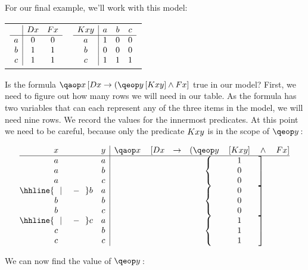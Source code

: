 \documentclass[PHIL101-Textbook.tex]{subfiles}
\begin{document}

For our final example, we'll work with this model:
\begin{center}
  \begin{tabular}{cc}
	$\begin{array}{c|cc}
	   & \mathord{D}{x}& \mathord{F}{x}\\ \hline
	   a & 0& 0 \\
	   b & 1 & 1 \\
	   c & 1 &1
	 \end{array}$				 
		 &
		   $\begin{array}{c|ccc}
			  \mathord{K}{xy} & a & b & c\\ \hline
			  a & 1& 0 & 0 \\
			  b & 0 & 0& 0\\
			  c & 1& 1 & 1
			\end{array}$
  \end{tabular}
\end{center}

\noindent Is the formula $\qab{x}{\atom D x \eif (\qeb{y}{ \atom K{xy}} \eand \atom F x}$ true in our model? First, we need to figure out how many rows we will need in our table. As the formula has two variables that can each represent any of the three items in the model, we will need nine rows. We record the values for the innermost predicates.  At this point we need to be careful, because only the predicate $\mathord{K}{xy}$ is in the scope of $\qe y$: 

\[
  \begin{array}{@{}cc|ccccccc@{}}
	x & y & \qa x & [\atom D x & \eif & (\qe y & [\atom K {xy}] & \eand & \atom F x]\\ \hline
	a & a &&&&\brax{3}{\ }&\vT&\braz{3}{\ }&\\
	a & b &&&&&\vF&&\\
	a & c &&&&&\vF&&\\
                 \hhline{~~|~~~~-~~}
	b & a &&&&\brax{3}{\ }&\vF&\braz{3}{\ }&\\
	b & b &&&&&\vF&&\\
	b & c &&&&&\vF&&\\
                 \hhline{~~|~~~~-~~}
	c & a &&&&\brax{3}{\ }&\vT&\braz{3}{\ }&\\
	c & b &&&&&\vT&&\\
	c & c &&&&&\vT&&\\
	\end{array}
  \]

\noindent We can now find the value of $\qe y$: 
\end{document}
